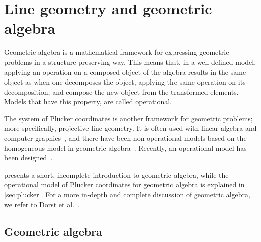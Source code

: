 \section{Line geometry and geometric algebra}
\label{ch:background}

Geometric algebra is a mathematical framework for expressing geometric problems in a structure-preserving way.  This means that, in a well-defined model, applying an operation on a composed object of the algebra results in the same object as when one decomposes the object, applying the same operation on its decomposition, and compose the new object from the transformed elements.  Models that have this property, are called operational.

The system of Pl\"ucker coordinates is another framework for geometric problems; more specifically, projective line geometry.  It is often used with linear algebra and computer graphics~\cite{Shoemake}, and there have been non-operational models based on the homogeneous model in geometric algebra~\cite[Chapter 12]{TheBook}.  Recently, an operational model has been designed~\cite{Hongbo}.

 presents a short, incomplete introduction to geometric algebra, while the operational model of Pl\"ucker coordinates for geometric algebra is explained in \autoref{sec:plucker}.  For a more in-depth and complete discussion of geometric algebra, we refer to Dorst et al.~\cite{TheBook}.

\subsection{Geometric algebra}
\label{sec:intro-ga}


